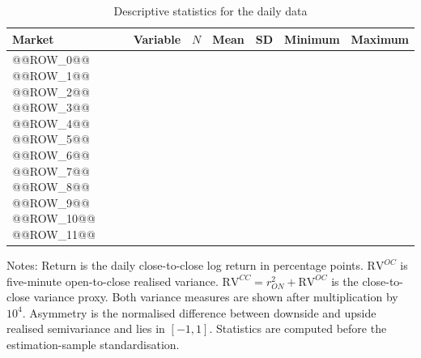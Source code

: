 \begin{table}[htbp]
\centering
\begin{threeparttable}
\caption{Descriptive statistics for the daily data}
\label{tab:data-summary}
\small
\begin{tabular}{@{}llrrrrr@{}}
\toprule
Market & Variable & $N$ & Mean & SD & Minimum & Maximum \\
\midrule
@@ROW_0@@
@@ROW_1@@
@@ROW_2@@
@@ROW_3@@
\addlinespace
@@ROW_4@@
@@ROW_5@@
@@ROW_6@@
@@ROW_7@@
\addlinespace
@@ROW_8@@
@@ROW_9@@
@@ROW_10@@
@@ROW_11@@
\bottomrule
\end{tabular}
\begin{tablenotes}[flushleft]
\footnotesize
\item Notes: Return is the daily close-to-close log return in percentage points. $\mathrm{RV}^{OC}$ is five-minute open-to-close realised variance. $\mathrm{RV}^{CC}=r_{ON}^2+\mathrm{RV}^{OC}$ is the close-to-close variance proxy. Both variance measures are shown after multiplication by $10^4$. Asymmetry is the normalised difference between downside and upside realised semivariance and lies in $[-1,1]$. Statistics are computed before the estimation-sample standardisation.
\end{tablenotes}
\end{threeparttable}
\end{table}
